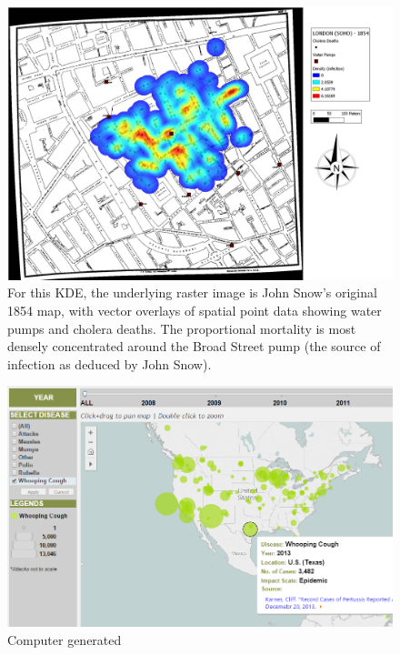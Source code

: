 \documentclass[12pt]{article}
\begin{document}
\begin{figure}
\centering
\hspace*{-3cm}
\includegraphics[scale=0.3]{gis_heatmap}
\caption{ For this KDE, the underlying raster image is John Snow's original 1854 map, with vector overlays of spatial point data showing water pumps and cholera deaths. The proportional mortality is most densely concentrated around the Broad Street pump (the source of infection as deduced by John Snow). \cite{heatmap}}
\label{fig:heatmap}
\end{figure}

\begin{figure}
\centering
\includegraphics[scale=0.7]{recent}
\caption{Computer generated \cite{viz}}
\label{fig:recent}
\end{figure}
\end{document}
